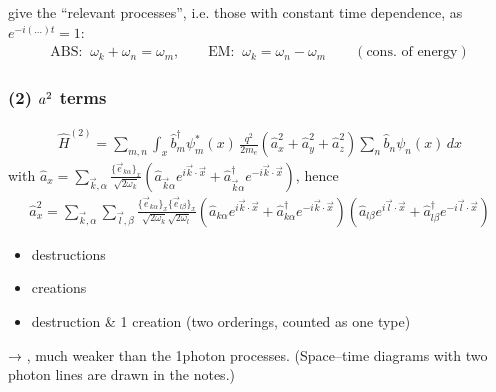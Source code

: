 \documentclass[letterpaper,10pt,english]{jupyterBook}
\begin{document}
\sphinxAtStartPar
give the “relevant processes”, i.e. those with constant time dependence, as \(e^{-i(\dots)t}=1\):
\begin{equation*}
\begin{split}
\text{ABS: }\ \omega_k+\omega_n=\omega_m,\qquad\text{EM: }\ \omega_k=\omega_n-\omega_m\qquad(\text{cons. of energy})
\end{split}
\end{equation*}\subsubsection*{(2) \protect\(a^2\protect\) terms}
\begin{equation*}
\begin{split}
\hat H^{(2)}=\sum_{m,n}\int_x\hat b_m^\dagger\psi^*_m(x)\,\frac{q^2}{2m_e}\left(\hat a_x^2+\hat a_y^2+\hat a_z^2\right)\sum_n\hat b_n\psi_n(x)\,dx
\end{split}
\end{equation*}
\sphinxAtStartPar
with \(\hat a_x=\sum_{\vec k,\alpha}\frac{\{\vec e_{k\alpha}\}_x}{\sqrt{2\omega_k}}\left(\hat a_{\vec k\alpha}e^{i\vec k\cdot\vec x}+\hat a^\dagger_{\vec k\alpha}e^{-i\vec k\cdot\vec x}\right)\), hence
\begin{equation*}
\begin{split}
\hat a_x^2=\sum_{\vec k,\alpha}\sum_{\vec l,\beta}\frac{\{\vec e_{k\alpha}\}_x\{\vec e_{l\beta}\}_x}{\sqrt{2\omega_k}\sqrt{2\omega_l}}\left(\hat a_{k\alpha}e^{i\vec k\cdot\vec x}+\hat a^\dagger_{k\alpha}e^{-i\vec k\cdot\vec x}\right)\left(\hat a_{l\beta}e^{i\vec l\cdot\vec x}+\hat a^\dagger_{l\beta}e^{-i\vec l\cdot\vec x}\right)
\end{split}
\end{equation*}
\sphinxAtStartPar
{}
\begin{itemize}
\item {} 
 destructions

\item {} 
 creations

\item {} 
 destruction \& 1 creation (two orderings, counted as one type)

\end{itemize}

\sphinxAtStartPar
→ , much weaker than the 1\sphinxhyphen{}photon processes. (Space–time diagrams with two photon lines are drawn in the notes.)
\end{document}
